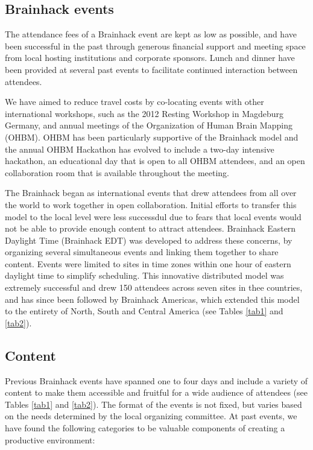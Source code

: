\documentclass[11pt]{bmc_article_s50}
\begin{document}
\subsection{Brainhack events}

The attendance fees of a Brainhack event are kept as low as possible, and have been successful in the past through generous financial support and meeting space from local hosting institutions and corporate sponsors. Lunch and dinner have been provided at several past events to facilitate continued interaction between attendees. 

We have aimed to reduce travel costs by co-locating events with other international workshops, such as the 2012 Resting Workshop in Magdeburg Germany, and annual meetings of the Organization of Human Brain Mapping (OHBM). OHBM has been particularly supportive of the Brainhack model and the annual OHBM Hackathon has evolved to include a two-day intensive hackathon, an educational day that is open to all OHBM attendees, and an open collaboration room that is available throughout the meeting.

The Brainhack began as international events that drew attendees from all over the world to work together in open collaboration. Initial efforts to transfer this model to the local level were less successdul due to fears that local events would not be able to provide enough content to attract attendees. Brainhack Eastern Daylight Time (Brainhack EDT) was developed to address these concerns, by organizing several simultaneous events and linking them together to share content. Events were limited to sites in time zones within one hour of eastern daylight time to simplify scheduling. This innovative distributed model was extremely successful and drew 150 attendees across seven sites in thee countries, and has since been followed by Brainhack Americas, which extended this model to the entirety of North, South and Central America (see Tables \ref{tab1} and \ref{tab2}).


\subsection{Content}

Previous Brainhack events have spanned one to four days and include a variety of content to make them accessible and fruitful for a wide audience of attendees (see Tables \ref{tab1} and \ref{tab2}). The format of the events is not fixed, but varies based on the needs determined by the local organizing committee. At past events, we have found the following categories to be valuable components of creating a productive environment:
\end{document}
